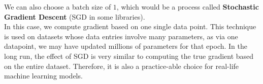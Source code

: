We can also choose a batch size of $1$, which would be a process called \textbf{Stochastic Gradient Descent} (SGD in some libraries). \\
In this case, we compute gradient based on one single data point. This technique is used on datasets whose data entries involve many parameters, as via one datapoint, we may have updated millions of parameters for that epoch. In the long run, the effect of SGD is very similar to computing the true gradient based on the entire dataset. Therefore, it is also a practice-able choice for real-life machine learning models.
